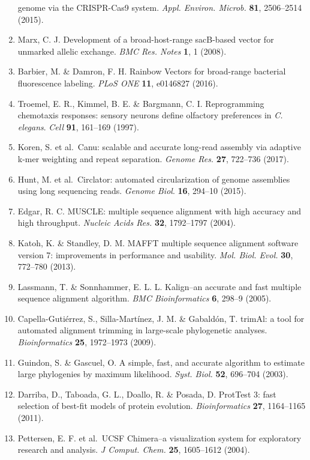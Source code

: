 \documentclass[11pt,]{article}
\begin{document}
\begin{enumerate}
  genome via the CRISPR-Cas9 system. \emph{Appl. Environ. Microb.}
  \textbf{81}, 2506--2514 (2015).
\item
  Marx, C. J. Development of a broad-host-range sacB-based vector for
  unmarked allelic exchange. \emph{BMC Res. Notes} \textbf{1}, 1 (2008).
\item
  Barbier, M. \& Damron, F. H. Rainbow Vectors for broad-range bacterial
  fluorescence labeling. \emph{PLoS ONE} \textbf{11}, e0146827 (2016).
\item
  Troemel, E. R., Kimmel, B. E. \& Bargmann, C. I. Reprogramming
  chemotaxis responses: sensory neurons define olfactory preferences in
  \emph{C. elegans}. \emph{Cell} \textbf{91}, 161--169 (1997).
\item
  Koren, S. et al.~Canu: scalable and accurate long-read assembly via
  adaptive k-mer weighting and repeat separation. \emph{Genome Res.}
  \textbf{27}, 722--736 (2017).
\item
  Hunt, M. et al.~Circlator: automated circularization of genome
  assemblies using long sequencing reads. \emph{Genome Biol}.
  \textbf{16}, 294--10 (2015).
\item
  Edgar, R. C. MUSCLE: multiple sequence alignment with high accuracy
  and high throughput. \emph{Nucleic Acids Res.} \textbf{32}, 1792--1797
  (2004).
\item
  Katoh, K. \& Standley, D. M. MAFFT multiple sequence alignment
  software version 7: improvements in performance and usability.
  \emph{Mol. Biol. Evol.} \textbf{30}, 772--780 (2013).
\item
  Lassmann, T. \& Sonnhammer, E. L. L. Kalign--an accurate and fast
  multiple sequence alignment algorithm. \emph{BMC Bioinformatics}
  \textbf{6}, 298--9 (2005).
\item
  Capella-Gutiérrez, S., Silla-Martínez, J. M. \& Gabaldón, T. trimAl: a
  tool for automated alignment trimming in large-scale phylogenetic
  analyses. \emph{Bioinformatics} \textbf{25}, 1972--1973 (2009).
\item
  Guindon, S. \& Gascuel, O. A simple, fast, and accurate algorithm to
  estimate large phylogenies by maximum likelihood. \emph{Syst. Biol.}
  \textbf{52}, 696--704 (2003).
\item
  Darriba, D., Taboada, G. L., Doallo, R. \& Posada, D. ProtTest 3: fast
  selection of best-fit models of protein evolution.
  \emph{Bioinformatics} \textbf{27}, 1164--1165 (2011).
\item
  Pettersen, E. F. et al.~UCSF Chimera--a visualization system for
  exploratory research and analysis. \emph{J Comput. Chem.} \textbf{25},
  1605--1612 (2004).
\end{enumerate}
\end{document}
